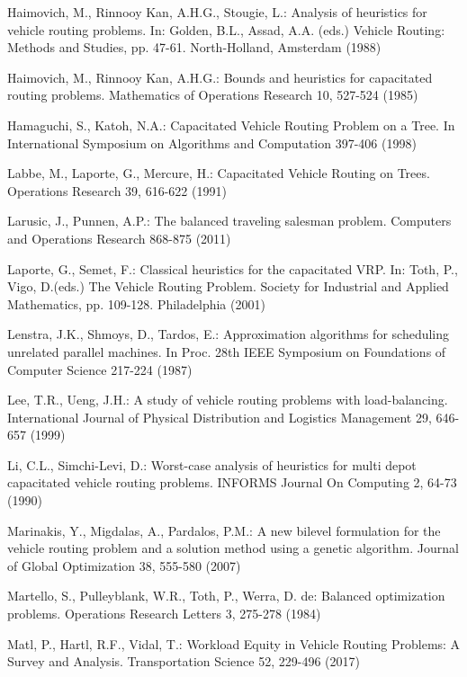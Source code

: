 \begin{thebibliography}{}
  Haimovich, M., Rinnooy Kan, A.H.G., Stougie, L.: Analysis of heuristics for vehicle routing problems. In: Golden, B.L., Assad, A.A. (eds.) Vehicle Routing: Methods and Studies, pp. 47-61. North-Holland, Amsterdam (1988)

 Haimovich, M., Rinnooy Kan, A.H.G.: Bounds and heuristics for capacitated routing problems. Mathematics of Operations Research 10, 527-524 (1985)  

  Hamaguchi, S., Katoh, N.A.: Capacitated Vehicle Routing Problem on a Tree. In International Symposium on Algorithms and Computation 397-406 (1998)

 Labbe, M., Laporte, G., Mercure, H.: Capacitated Vehicle Routing on Trees. Operations Research 39, 616-622 (1991)

 Larusic, J., Punnen, A.P.: The balanced traveling salesman problem. Computers and Operations Research 868-875 (2011) 

  Laporte, G., Semet, F.: Classical heuristics for the capacitated VRP. In: Toth, P., Vigo, D.(eds.) The Vehicle Routing Problem. Society for Industrial and Applied Mathematics, pp. 109-128. Philadelphia (2001) 

  Lenstra, J.K., Shmoys, D., Tardos, E.: Approximation algorithms for scheduling unrelated parallel machines. In Proc. 28th IEEE Symposium on Foundations of Computer Science 217-224 (1987) 

 Lee, T.R., Ueng, J.H.: A study of vehicle routing problems with load-balancing. International Journal of Physical Distribution and Logistics Management 29, 646-657 (1999) 

  Li, C.L., Simchi-Levi, D.: Worst-case analysis of heuristics for multi depot capacitated vehicle routing problems. INFORMS Journal On Computing 2, 64-73 (1990)  

  Marinakis, Y., Migdalas, A., Pardalos, P.M.: A new bilevel formulation for the vehicle routing problem and a solution method using a genetic algorithm. Journal of Global Optimization 38, 555-580 (2007)

 Martello, S., Pulleyblank, W.R., Toth, P., Werra, D. de: Balanced optimization problems. Operations Research Letters 3, 275-278 (1984)

 Matl, P., Hartl, R.F., Vidal, T.: Workload Equity in Vehicle Routing Problems: A Survey and Analysis. Transportation Science 52, 229-496 (2017) 


\end{thebibliography}
